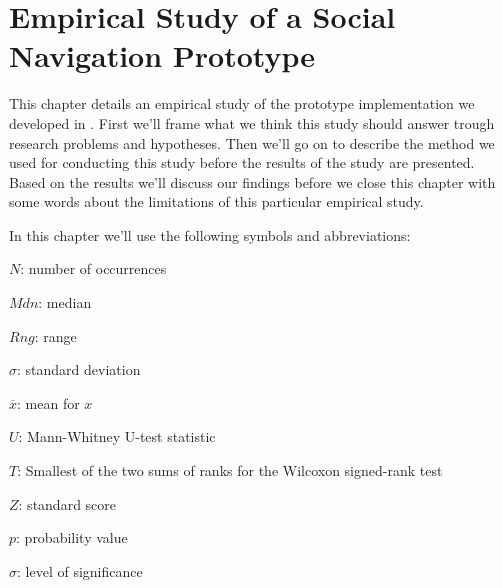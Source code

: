 \chapter{Empirical Study of a Social Navigation Prototype}
\label{chapter:empirical}

This chapter details an empirical study of the prototype implementation we
developed in . First we'll frame what we think this
study should answer trough research problems and hypotheses. Then we'll go on
to describe the method we used for conducting this study before the results of
the study are presented. Based on the results we'll discuss our findings
before we close this chapter with some words about the limitations of this
particular empirical study.

In this chapter we'll use the following symbols and abbreviations:

\begin{items}
  \item $N$: number of occurrences
  \item $Mdn$: median
  \item $Rng$: range
  \item $\sigma$: standard deviation
  \item $\overline{x}$: mean for $x$
  \item $U$: Mann-Whitney U-test statistic
  \item $T$: Smallest of the two sums of ranks for
    the Wilcoxon signed-rank test
  \item $Z$: standard score
  \item $p$: probability value
  \item $\sigma$: level of significance
\end{items}






